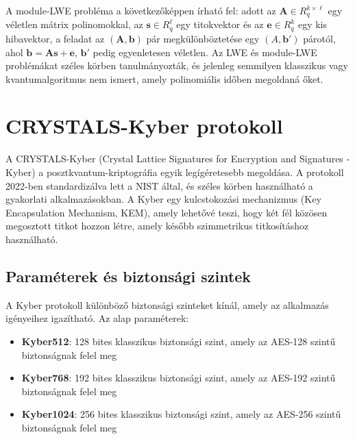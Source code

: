 A module-LWE probléma a következőképpen írható fel: adott az $\mathbf{A} \in R_q^{k \times \ell}$
egy véletlen mátrix polinomokkal, az $\mathbf{s} \in R_q^{\ell}$ egy titokvektor és az
$\mathbf{e} \in R_q^{k}$ egy kis hibavektor, a feladat az $(\mathbf{A}, \mathbf{b})$
pár megkülönböztetése egy $(A, \mathbf{b}')$ párotól, ahol $\mathbf{b} = \mathbf{A}\mathbf{s} + \mathbf{e}$,
$\mathbf{b}'$ pedig egyenletesen véletlen. Az LWE és module-LWE problémákat széles körben tanulmányozták,
és jelenleg semmilyen klasszikus vagy kvantumalgoritmus nem ismert, amely polinomiális időben
megoldaná őket.


\section{CRYSTALS-Kyber protokoll}


A CRYSTALS-Kyber (Crystal Lattice Signatures for Encryption and Signatures - Kyber) a posztkvantum-kriptográfia 
egyik legígéretesebb megoldása. A protokoll 2022-ben standardizálva lett a NIST által, és széles körben 
használható a gyakorlati alkalmazásokban. A Kyber egy kulcstokozási mechanizmus (Key Encapsulation Mechanism, KEM), 
amely lehetővé teszi, hogy két fél közösen megosztott titkot hozzon létre, amely később szimmetrikus titkosításhoz 
használható.

\subsection{Paraméterek és biztonsági szintek}

A Kyber protokoll különböző biztonsági szinteket kínál, amely az alkalmazás igényeihez igazítható. 
Az alap paraméterek:

\begin{itemize}
    \item \textbf{Kyber512}: 128 bites klasszikus biztonsági szint, amely az AES-128 szintű biztonságnak felel meg
    \item \textbf{Kyber768}: 192 bites klasszikus biztonsági szint, amely az AES-192 szintű biztonságnak felel meg
    \item \textbf{Kyber1024}: 256 bites klasszikus biztonsági szint, amely az AES-256 szintű biztonságnak felel meg
\end{itemize}

